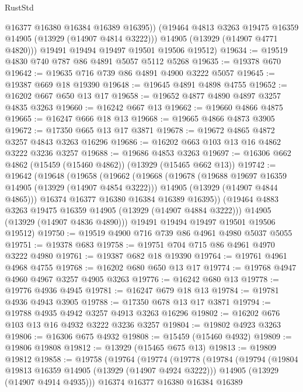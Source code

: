 \begin{lexlean}{RustStd}
\begin{coremodule}
            @16377
            @16380
            @16384
            @16389
            @16395))
        (@19464 @4813 @3263 @19475 @16359 @14905 (@13929 (@14907 @4814 @3222)))
        @14905
        (@13929 (@14907 @4771 @4820)))
      @19491
      @19494
      @19497
      @19501
      @19506
      @19512)
@19634 := @19519 @4830 @740 @787 @86 @4891 @5057 @5112 @5268
@19635 := @19378 @670
@19642 := @19635 @716 @739 @86 @4891 @4900 @3222 @5057
@19645 := @19387 @669 @18 @19390
@19648 := @19645 @4891 @4898 @4755
@19652 := @16202 @667 @650 @13 @17
@19658 := @19652 @4877 @4890 @4897 @3257 @4835 @3263
@19660 := @16242 @667 @13
@19662 := @19660 @4866 @4875
@19665 := @16247 @666 @18 @13
@19668 := @19665 @4866 @4873 @3905
@19672 := @17350 @665 @13 @17 @3871
@19678 := @19672 @4865 @4872 @3257 @4843 @3263 @16296
@19686 := @16202 @663 @103 @13 @16 @4862 @3222 @3236 @3257
@19688 := @19686 @4853 @3263
@19697 := @16306 @662 @4862 (@15459 (@15460 @4862)) (@13929 (@15465 @662 @13))
@19742 := @19642
    (@19648
      (@19658
        (@19662
          (@19668
            (@19678
              (@19688 @19697 @16359 @14905 (@13929 (@14907 @4854 @3222)))
              @14905
              (@13929 (@14907 @4844 @4865)))
            @16374
            @16377
            @16380
            @16384
            @16389
            @16395))
        (@19464 @4883 @3263 @19475 @16359 @14905 (@13929 (@14907 @4884 @3222)))
        @14905
        (@13929 (@14907 @4836 @4890)))
      @19491
      @19494
      @19497
      @19501
      @19506
      @19512)
@19750 := @19519 @4900 @716 @739 @86 @4961 @4980 @5037 @5055
@19751 := @19378 @683
@19758 := @19751 @704 @715 @86 @4961 @4970 @3222 @4980
@19761 := @19387 @682 @18 @19390
@19764 := @19761 @4961 @4968 @4755
@19768 := @16202 @680 @650 @13 @17
@19774 := @19768 @4947 @4960 @4967 @3257 @4905 @3263
@19776 := @16242 @680 @13
@19778 := @19776 @4936 @4945
@19781 := @16247 @679 @18 @13
@19784 := @19781 @4936 @4943 @3905
@19788 := @17350 @678 @13 @17 @3871
@19794 := @19788 @4935 @4942 @3257 @4913 @3263 @16296
@19802 := @16202 @676 @103 @13 @16 @4932 @3222 @3236 @3257
@19804 := @19802 @4923 @3263
@19806 := @16306 @675 @4932
@19808 := @15459 (@15460 @4932)
@19809 := @19806 @19808
@19812 := @13929 (@15465 @675 @13)
@19813 := @19809 @19812
@19858 := @19758
    (@19764
      (@19774
        (@19778
          (@19784
            (@19794
              (@19804 @19813 @16359 @14905 (@13929 (@14907 @4924 @3222)))
              @14905
              (@13929 (@14907 @4914 @4935)))
            @16374
            @16377
            @16380
            @16384
            @16389

\end{coremodule}
\end{lexlean}
